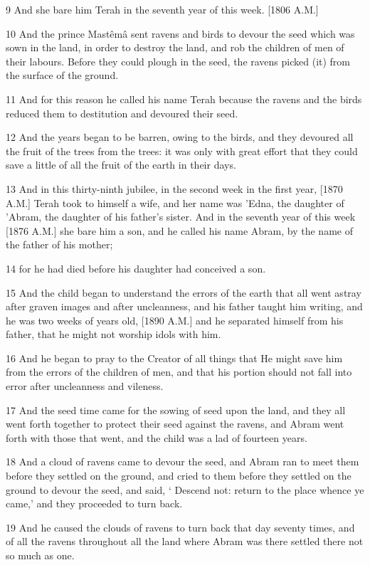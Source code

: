 \par 9 And she bare him Terah in the seventh year of this week. [1806 A.M.]
\par 10 And the prince Mastêmâ sent ravens and birds to devour the seed which was sown in the land, in order to destroy the land, and rob the children of men of their labours. Before they could plough in the seed, the ravens picked (it) from the surface of the ground.
\par 11 And for this reason he called his name Terah because the ravens and the birds reduced them to destitution and devoured their seed.
\par 12 And the years began to be barren, owing to the birds, and they devoured all the fruit of the trees from the trees: it was only with great effort that they could save a little of all the fruit of the earth in their days.
\par 13 And in this thirty-ninth jubilee, in the second week in the first year, [1870 A.M.] Terah took to himself a wife, and her name was 'Edna, the daughter of 'Abram, the daughter of his father's sister. And in the seventh year of this week [1876 A.M.] she bare him a son, and he called his name Abram, by the name of the father of his mother;
\par 14 for he had died before his daughter had conceived a son.
\par 15 And the child began to understand the errors of the earth that all went astray after graven images and after uncleanness, and his father taught him writing, and he was two weeks of years old, [1890 A.M.] and he separated himself from his father, that he might not worship idols with him.
\par 16 And he began to pray to the Creator of all things that He might save him from the errors of the children of men, and that his portion should not fall into error after uncleanness and vileness.
\par 17 And the seed time came for the sowing of seed upon the land, and they all went forth together to protect their seed against the ravens, and Abram went forth with those that went, and the child was a lad of fourteen years.
\par 18 And a cloud of ravens came to devour the seed, and Abram ran to meet them before they settled on the ground, and cried to them before they settled on the ground to devour the seed, and said, ‘ Descend not: return to the place whence ye came,’ and they proceeded to turn back.
\par 19 And he caused the clouds of ravens to turn back that day seventy times, and of all the ravens throughout all the land where Abram was there settled there not so much as one.
